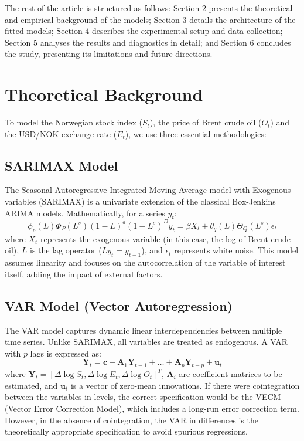 \documentclass[11pt,a4paper]{article}
\begin{document}
The rest of the article is structured as follows: Section 2 presents the theoretical and empirical background of the models; Section 3 details the architecture of the fitted models; Section 4 describes the experimental setup and data collection; Section 5 analyses the results and diagnostics in detail; and Section 6 concludes the study, presenting its limitations and future directions.

\section{Theoretical Background}
To model the Norwegian stock index ($S_t$), the price of Brent crude oil ($O_t$) and the USD/NOK exchange rate ($E_t$), we use three essential methodologies:

\subsection{SARIMAX Model}
The Seasonal Autoregressive Integrated Moving Average model with Exogenous variables (SARIMAX) is a univariate extension of the classical Box-Jenkins ARIMA models. Mathematically, for a series $y_t$:
\begin{equation}
\phi_p(L)\Phi_P(L^s)(1-L)^d(1-L^s)^D y_t = \beta X_t + \theta_q(L)\Theta_Q(L^s)\epsilon_t
\end{equation}
where $X_t$ represents the exogenous variable (in this case, the log of Brent crude oil), $L$ is the lag operator ($L y_t = y_{t-1}$), and $\epsilon_t$ represents white noise. This model assumes linearity and focuses on the autocorrelation of the variable of interest itself, adding the impact of external factors.

\subsection{VAR Model (Vector Autoregression)}
The VAR model captures dynamic linear interdependencies between multiple time series. Unlike SARIMAX, all variables are treated as endogenous. A VAR with $p$ lags is expressed as:
\begin{equation}
\mathbf{Y}_t = \mathbf{c} + \mathbf{A}_1 \mathbf{Y}_{t-1} + \dots + \mathbf{A}_p \mathbf{Y}_{t-p} + \mathbf{u}_t
\end{equation}
where $\mathbf{Y}_t = [\Delta \log S_t, \Delta \log E_t, \Delta \log O_t]^T$, $\mathbf{A}_i$ are coefficient matrices to be estimated, and $\mathbf{u}_t$ is a vector of zero-mean innovations. If there were cointegration between the variables in levels, the correct specification would be the VECM (Vector Error Correction Model), which includes a long-run error correction term. However, in the absence of cointegration, the VAR in differences is the theoretically appropriate specification to avoid spurious regressions.
\end{document}
